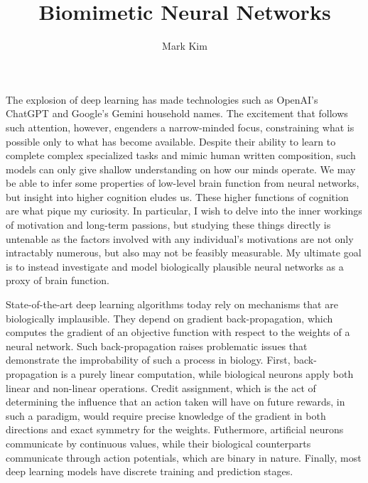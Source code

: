\documentclass[12pt]{article}
\title{Biomimetic Neural Networks}
\author{Mark Kim}
\begin{document}
\maketitle

The explosion of deep learning has made technologies such as OpenAI's ChatGPT
and Google's Gemini household names.  The excitement that follows such
attention, however, engenders a narrow-minded focus, constraining what is
possible only to what has become available.  Despite their ability
to learn to complete complex specialized tasks and mimic human written
composition, such models can only give shallow understanding on how our minds
operate. We may be able to infer some properties of low-level brain function
from neural networks, but insight into higher cognition eludes us.  These higher
functions of cognition are what pique my curiosity.  In particular, I wish to
delve into the inner workings of motivation and long-term passions, but studying
these things directly is untenable as the factors involved with any individual's
motivations are not only intractably numerous, but also may not be feasibly
measurable.  My ultimate goal is to instead investigate and model biologically
plausible neural networks as a proxy of brain function.

State-of-the-art deep learning algorithms today rely on mechanisms that are
biologically implausible.  They depend on gradient back-propagation, which
computes the gradient of an objective function with respect to the weights of a
neural network.  Such back-propagation raises problematic issues that
demonstrate the improbability of such a process in biology.  First,
back-propagation is a purely linear computation, while biological neurons apply
both linear and non-linear operations. Credit assignment, which is the act of
determining the influence that an action taken will have on future rewards, in
such a paradigm, would require precise knowledge of the gradient in both
directions and exact symmetry for the weights.  Futhermore, artificial neurons
communicate by continuous values, while their biological counterparts
communicate through action potentials, which are binary in nature.  Finally,
most deep learning models have discrete training and prediction stages.
\end{document}
